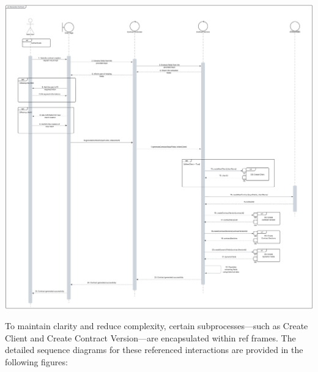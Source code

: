 \begin{center}
    \centering
    \includegraphics[width=1\textwidth]{Images/Sequence Diagram - Draft Contract.png}
    \label{fig:sequence_diagram_draft_contract}
\end{center}

To maintain clarity and reduce complexity, certain subprocesses—such as Create Client and Create Contract Version—are encapsulated within ref frames. The detailed sequence diagrams for these referenced interactions are provided in the following figures:

